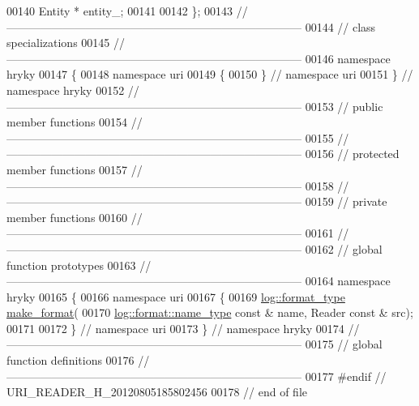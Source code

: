 \begin{DoxyCode}
00140     Entity *            entity\_;
00141 
00142 \};
00143 \textcolor{comment}{//
      ------------------------------------------------------------------------------}
00144 \textcolor{comment}{// class specializations}
00145 \textcolor{comment}{//
      ------------------------------------------------------------------------------}
00146 \textcolor{keyword}{namespace }hryky
00147 \{
00148 \textcolor{keyword}{namespace }uri
00149 \{
00150 \} \textcolor{comment}{// namespace uri}
00151 \} \textcolor{comment}{// namespace hryky}
00152 \textcolor{comment}{//
      ------------------------------------------------------------------------------}
00153 \textcolor{comment}{// public member functions}
00154 \textcolor{comment}{//
      ------------------------------------------------------------------------------}
00155 \textcolor{comment}{//
      ------------------------------------------------------------------------------}
00156 \textcolor{comment}{// protected member functions}
00157 \textcolor{comment}{//
      ------------------------------------------------------------------------------}
00158 \textcolor{comment}{//
      ------------------------------------------------------------------------------}
00159 \textcolor{comment}{// private member functions}
00160 \textcolor{comment}{//
      ------------------------------------------------------------------------------}
00161 \textcolor{comment}{//
      ------------------------------------------------------------------------------}
00162 \textcolor{comment}{// global function prototypes}
00163 \textcolor{comment}{//
      ------------------------------------------------------------------------------}
00164 \textcolor{keyword}{namespace }hryky
00165 \{
00166 \textcolor{keyword}{namespace }uri
00167 \{
00169     \hyperlink{namespacehryky_1_1log_ad50448c3f934f1eacd5c1bcffe8111e1}{log::format_type} \hyperlink{namespacehryky_1_1uri_a4c47d905f62ff90b7026c9f3f6544a9b}{make_format}(
00170         \hyperlink{namespacehryky_1_1log_1_1format_ab7408d1e2ed2d648dbf9bba69eb74288}{log::format::name_type} \textcolor{keyword}{const} & name, Reader \textcolor{keyword}{const} & src);
00171 
00172 \} \textcolor{comment}{// namespace uri}
00173 \} \textcolor{comment}{// namespace hryky}
00174 \textcolor{comment}{//
      ------------------------------------------------------------------------------}
00175 \textcolor{comment}{// global function definitions}
00176 \textcolor{comment}{//
      ------------------------------------------------------------------------------}
00177 \textcolor{preprocessor}{#endif // URI\_READER\_H\_20120805185802456}
00178 \textcolor{preprocessor}{}\textcolor{comment}{// end of file}
\end{DoxyCode}
